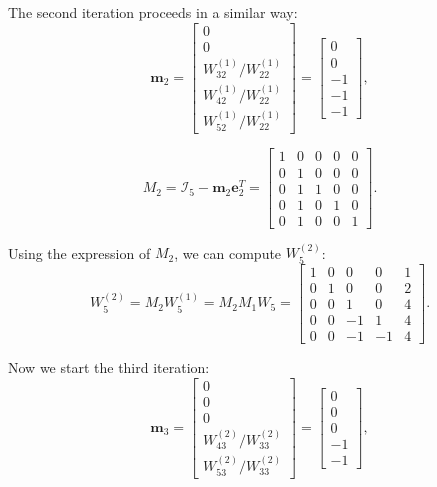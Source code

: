 \documentclass[a4paper]{report}
\numberwithin{equation}{chapter}
\begin{document}
The second iteration proceeds in a similar way:
\begin{equation}\label{key}
	\textbf{m}_2 = 
	\begin{bmatrix}
		0\\
		0\\
		{W^{(1)}_{32}}/{W^{(1)}_{22}}\\
		{W^{(1)}_{42}}/{W^{(1)}_{22}}\\
		{W^{(1)}_{52}}/{W^{(1)}_{22}}
	\end{bmatrix}=
	\begin{bmatrix}
		0\\
		0\\
		-1\\
		-1\\
		-1
	\end{bmatrix},
\end{equation}

\begin{equation}\label{key}
	M_2=\mathcal{I}_5 - \textbf{m}_2\textbf{e}_2^T =
	\begin{bmatrix}
		1 & 0  & 0  & 0  & 0  \\
		0 & 1 & 0 & 0 & 0\\
		0 & 1 & 1 & 0 & 0 \\
		0 & 1 & 0 & 1 & 0 \\
		0 & 1 & 0 & 0 & 1 
	\end{bmatrix}.
\end{equation}

\noindent Using the expression of $M_2$, we can compute $W_5^{(2)}$:
\begin{equation}\label{key}
	W_5^{(2)} = M_2 W_5^{(1)} = M_2 M_1 W_5 =
	\begin{bmatrix}
		1 & 0  & 0  & 0  & 1  \\
		0 & 1 & 0 & 0 & 2 \\
		0 & 0 & 1 & 0 & 4 \\
		0 & 0 & -1 & 1 & 4 \\
		0 & 0 & -1 & -1 & 4 
	\end{bmatrix}.
\end{equation}
	
\noindent Now we start the third iteration:
\begin{equation}\label{key}
	\textbf{m}_3 = 
	\begin{bmatrix}
		0\\
		0\\
		0\\
		{W^{(2)}_{43}}/{W^{(2)}_{33}}\\
		{W^{(2)}_{53}}/{W^{(2)}_{33}}
	\end{bmatrix}=
	\begin{bmatrix}
		0\\
		0\\
		0\\
		-1\\
		-1
	\end{bmatrix},
\end{equation}
	
\end{document}
